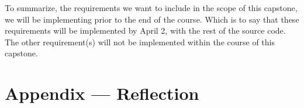 \documentclass{article}
\begin{document}
To summarize, the requirements we want to include in the scope of this capstone, we will be implementing prior to the end of the course. Which is to say 
that these requirements will be implemented by April 2, with the rest of the source code. The other requirement(s) will not be implemented within the course of this capstone.



\newpage{}

\section*{Appendix --- Reflection}



\end{document}
